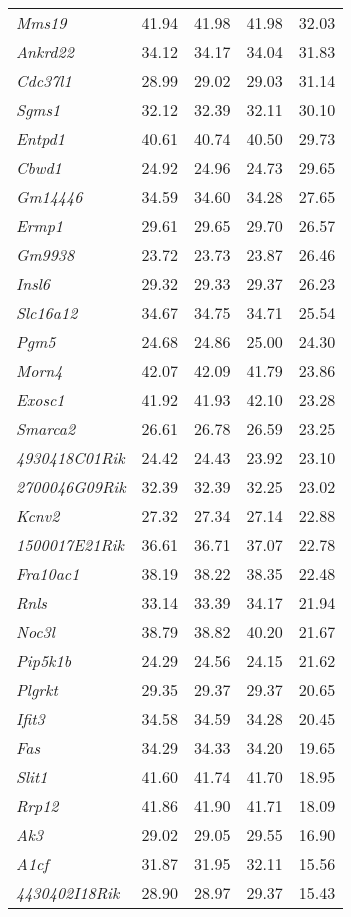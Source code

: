 \documentclass{book}
\begin{document}
\begin{table}[ht]
\begin{tabular}{>{\em}lrrrr}
  Mms19 & 41.94 & 41.98 & 41.98 & 32.03 \\
  Ankrd22 & 34.12 & 34.17 & 34.04 & 31.83 \\
  Cdc37l1 & 28.99 & 29.02 & 29.03 & 31.14 \\
  Sgms1 & 32.12 & 32.39 & 32.11 & 30.10 \\
  Entpd1 & 40.61 & 40.74 & 40.50 & 29.73 \\
  Cbwd1 & 24.92 & 24.96 & 24.73 & 29.65 \\
  Gm14446 & 34.59 & 34.60 & 34.28 & 27.65 \\
  Ermp1 & 29.61 & 29.65 & 29.70 & 26.57 \\
  Gm9938 & 23.72 & 23.73 & 23.87 & 26.46 \\
  Insl6 & 29.32 & 29.33 & 29.37 & 26.23 \\
  Slc16a12 & 34.67 & 34.75 & 34.71 & 25.54 \\
  Pgm5 & 24.68 & 24.86 & 25.00 & 24.30 \\
  Morn4 & 42.07 & 42.09 & 41.79 & 23.86 \\
  Exosc1 & 41.92 & 41.93 & 42.10 & 23.28 \\
  Smarca2 & 26.61 & 26.78 & 26.59 & 23.25 \\
  4930418C01Rik & 24.42 & 24.43 & 23.92 & 23.10 \\
  2700046G09Rik & 32.39 & 32.39 & 32.25 & 23.02 \\
  Kcnv2 & 27.32 & 27.34 & 27.14 & 22.88 \\
  1500017E21Rik & 36.61 & 36.71 & 37.07 & 22.78 \\
  Fra10ac1 & 38.19 & 38.22 & 38.35 & 22.48 \\
  Rnls & 33.14 & 33.39 & 34.17 & 21.94 \\
  Noc3l & 38.79 & 38.82 & 40.20 & 21.67 \\
  Pip5k1b & 24.29 & 24.56 & 24.15 & 21.62 \\
  Plgrkt & 29.35 & 29.37 & 29.37 & 20.65 \\
  Ifit3 & 34.58 & 34.59 & 34.28 & 20.45 \\
  Fas & 34.29 & 34.33 & 34.20 & 19.65 \\
  Slit1 & 41.60 & 41.74 & 41.70 & 18.95 \\
  Rrp12 & 41.86 & 41.90 & 41.71 & 18.09 \\
  Ak3 & 29.02 & 29.05 & 29.55 & 16.90 \\
  A1cf & 31.87 & 31.95 & 32.11 & 15.56 \\
  4430402I18Rik & 28.90 & 28.97 & 29.37 & 15.43 \\

\end{tabular}
\end{table}
\end{document}
